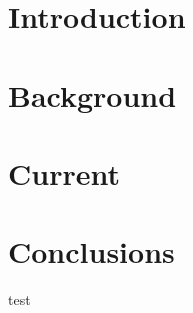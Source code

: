 \documentclass[a4paper 12pt]{article}
\begin{document}



\tableofcontents
\clearpage
\section{Introduction}

\section{Background}




\section{Current}

\section{Conclusions}

test \cite{5367579}
\clearpage
\printbibliography
\end{document}
